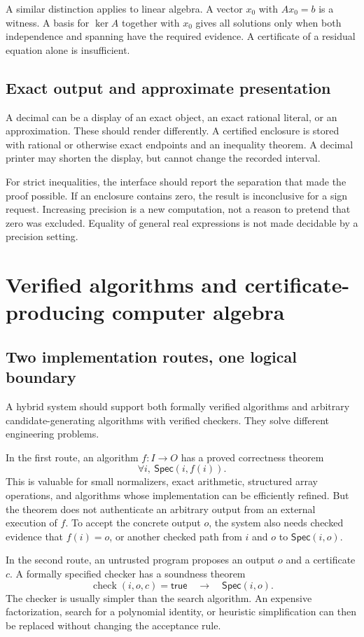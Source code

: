 \documentclass[11pt,a4paper]{article}
\newcommand{\Spec}{\mathsf{Spec}}
\theoremstyle{definition}
\begin{document}
A similar distinction applies to linear algebra. A vector $x_0$ with $Ax_0=b$
is a witness. A basis for $\ker A$ together with $x_0$ gives all solutions only
when both independence and spanning have the required evidence. A certificate
of a residual equation alone is insufficient.

\subsection{Exact output and approximate presentation}
A decimal can be a display of an exact object, an exact rational literal, or an
approximation. These should render differently. A certified enclosure is stored
with rational or otherwise exact endpoints and an inequality theorem. A decimal
printer may shorten the display, but cannot change the recorded interval.

For strict inequalities, the interface should report the separation that made
the proof possible. If an enclosure contains zero, the result is inconclusive
for a sign request. Increasing precision is a new computation, not a reason to
pretend that zero was excluded. Equality of general real expressions is not
made decidable by a precision setting.

\section{Verified algorithms and certificate-producing computer algebra}
\label{sec:cas}
\subsection{Two implementation routes, one logical boundary}
A hybrid system should support both formally verified algorithms and arbitrary
candidate-generating algorithms with verified checkers. They solve different
engineering problems.

In the first route, an algorithm $f:I\to O$ has a proved correctness theorem
\[
 \forall i,\ \Spec(i,f(i)).
\]
This is valuable for small normalizers, exact arithmetic, structured array
operations, and algorithms whose implementation can be efficiently refined.
But the theorem does not authenticate an arbitrary output from an external
execution of $f$. To accept the concrete output $o$, the system also needs
checked evidence that $f(i)=o$, or another checked path from $i$ and $o$ to
$\Spec(i,o)$.

In the second route, an untrusted program proposes an output $o$ and a certificate
$c$. A formally specified checker has a soundness theorem
\begin{equation}
 \operatorname{check}(i,o,c)=\mathsf{true}
 \quad\longrightarrow\quad \Spec(i,o).
 \label{eq:checker}
\end{equation}
The checker is usually simpler than the search algorithm. An expensive
factorization, search for a polynomial identity, or heuristic simplification can
then be replaced without changing the acceptance rule.
\end{document}
